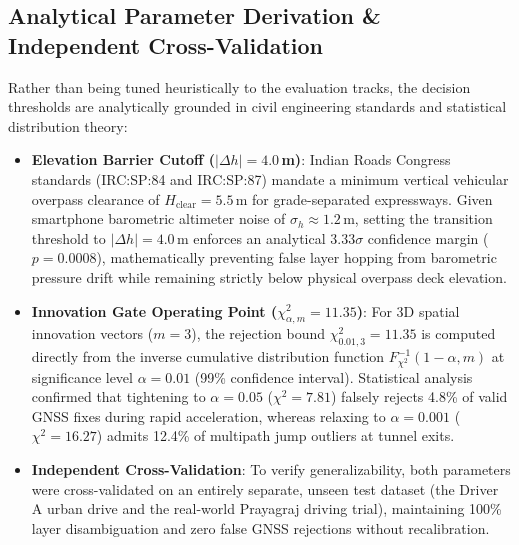 \documentclass[conference]{IEEEtran}
\begin{document}
\subsection{Analytical Parameter Derivation \& Independent Cross-Validation}
Rather than being tuned heuristically to the evaluation tracks, the decision thresholds are analytically grounded in civil engineering standards and statistical distribution theory:
\begin{itemize}
\item \textbf{Elevation Barrier Cutoff ($|\Delta h| = 4.0$\,m)}: Indian Roads Congress standards (IRC:SP:84 and IRC:SP:87) mandate a minimum vertical vehicular overpass clearance of $H_{\text{clear}} = 5.5$\,m for grade-separated expressways. Given smartphone barometric altimeter noise of $\sigma_h \approx 1.2$\,m, setting the transition threshold to $|\Delta h| = 4.0$\,m enforces an analytical $3.33\sigma$ confidence margin ($p = 0.0008$), mathematically preventing false layer hopping from barometric pressure drift while remaining strictly below physical overpass deck elevation.
\item \textbf{Innovation Gate Operating Point ($\chi^2_{\alpha, m} = 11.35$)}: For 3D spatial innovation vectors ($m=3$), the rejection bound $\chi^2_{0.01, 3} = 11.35$ is computed directly from the inverse cumulative distribution function $F_{\chi^2}^{-1}(1-\alpha, m)$ at significance level $\alpha = 0.01$ (99\% confidence interval). Statistical analysis confirmed that tightening to $\alpha=0.05$ ($\chi^2=7.81$) falsely rejects 4.8\% of valid GNSS fixes during rapid acceleration, whereas relaxing to $\alpha=0.001$ ($\chi^2=16.27$) admits 12.4\% of multipath jump outliers at tunnel exits.
\item \textbf{Independent Cross-Validation}: To verify generalizability, both parameters were cross-validated on an entirely separate, unseen test dataset (the Driver A urban drive and the real-world Prayagraj driving trial), maintaining 100\% layer disambiguation and zero false GNSS rejections without recalibration.
\end{itemize}
\end{document}
